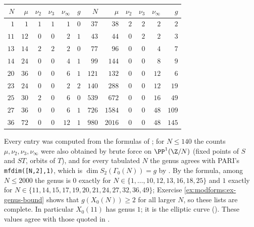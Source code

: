 \begin{center}
\begin{tabular}{@{}rrrrrr@{\qquad}rrrrrr@{}}
\toprule
$N$ & $\mu$ & $\nu_2$ & $\nu_3$ & $\nu_\infty$ & $g$ & $N$ & $\mu$ & $\nu_2$ & $\nu_3$ & $\nu_\infty$ & $g$\\
\midrule
$1$ & $1$ & $1$ & $1$ & $1$ & $0$ & $37$ & $38$ & $2$ & $2$ & $2$ & $2$\\
$11$ & $12$ & $0$ & $0$ & $2$ & $1$ & $43$ & $44$ & $0$ & $2$ & $2$ & $3$\\
$13$ & $14$ & $2$ & $2$ & $2$ & $0$ & $77$ & $96$ & $0$ & $0$ & $4$ & $7$\\
$14$ & $24$ & $0$ & $0$ & $4$ & $1$ & $99$ & $144$ & $0$ & $0$ & $8$ & $9$\\
$20$ & $36$ & $0$ & $0$ & $6$ & $1$ & $121$ & $132$ & $0$ & $0$ & $12$ & $6$\\
$23$ & $24$ & $0$ & $0$ & $2$ & $2$ & $140$ & $288$ & $0$ & $0$ & $12$ & $19$\\
$25$ & $30$ & $2$ & $0$ & $6$ & $0$ & $539$ & $672$ & $0$ & $0$ & $16$ & $49$\\
$27$ & $36$ & $0$ & $0$ & $6$ & $1$ & $726$ & $1584$ & $0$ & $0$ & $48$ & $109$\\
$36$ & $72$ & $0$ & $0$ & $12$ & $1$ & $980$ & $2016$ & $0$ & $0$ & $48$ & $145$\\
\bottomrule
\end{tabular}
\end{center}
Every entry was computed from the formulas of ; for $N\le140$ the counts
$\mu,\nu_2,\nu_3,\nu_\infty$ were also obtained by brute force on $\PP^1(\Z/N)$ (fixed points of $S$ and $ST$, orbits of $T$), and for every tabulated $N$ the genus agrees
with PARI's \texttt{mfdim([N,2],1)}, which is $\dim S_2(\Gamma_0(N))=g$ by . By the formula, among $N\le2000$ the genus is $0$
exactly for $N\in\{1,\dots,10,12,13,16,18,25\}$ and $1$ exactly for $N\in\{11,14,15,17,19,20,21,24,27,32,36,49\}$; Exercise \ref{ex:modforms:ex-genus-bound} shows that
$g(X_0(N))\ge2$ for all larger $N$, so these lists are complete. In particular $X_0(11)$ has genus $1$; it is the elliptic curve  (). These
values agree with those quoted in .

